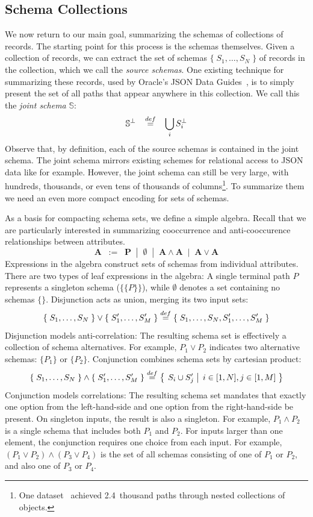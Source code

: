 
\subsection{Schema Collections}
We now return to our main goal, summarizing the schemas of collections of \json records.  
The starting point for this process is the schemas themselves.  
Given a collection of \json records, we can extract the set of schemas $\{\;S_1, \ldots, S_N\;\}$ of records in the collection, which we call the \emph{source schemas}.
One existing technique for summarizing these records, used by Oracle's JSON Data Guides~\cite{oracledataguide,DBLP:conf/sigmod/LiuHMLC16}, is to simply present the set of all paths that appear anywhere in this collection.
We call this the \emph{joint schema} $\mathbb S$:
$$\mathbb S^\bot \;\;\; \overset{def}{=} \;\;\; \bigcup_i S_i^\bot$$
Observe that, by definition, each of the source schemas is contained in the joint schema.
The joint schema mirrors existing schemes for relational access to JSON data like  for example.  
However, the joint schema can still be very large, with hundreds, thousands, or even tens of thousands of columns\footnote{One dataset~\cite{pharmadata} achieved 2.4~thousand paths through nested collections of objects.}.
To summarize them we need an even more compact encoding for sets of schemas.  

As a basis for compacting schema sets, we define a simple algebra.
Recall that we are particularly interested in summarizing cooccurrence and anti-cooccurence relationships between attributes.
$$\mathbf{A}\;\;:=\;\;\mathbf{P}\;\;|\;\;\emptyset\;\;|\;\;\mathbf{A} \wedge \mathbf{A}\;\;|\;\;\mathbf{A} \vee \mathbf{A}$$
Expressions in the algebra construct sets of schemas from individual attributes.
There are two types of leaf expressions in the algebra:
A single terminal path $P$ represents a singleton schema ($\big\{\{P\}\big\}$), while $\emptyset$ denotes a set containing no schemas $\big\{\big\}$.
Disjunction acts as union, merging its two input sets:
$$
\{\;S_1, \ldots, S_N\;\} \vee \{\;S'_1, \ldots, S'_M\;\} 
\overset{def}{=}
\{\;S_1, \ldots, S_N, S'_1, \ldots, S'_M\;\}
$$
Disjunction models anti-correlation: The resulting schema set is effectively a collection of schema alternatives.  
For example, $P_1 \vee P_2$ indicates two alternative schemas: $\{P_1\}$ or $\{P_2\}$.
Conjunction combines schema sets by cartesian product:
{\small
$$
\{\;S_1, \ldots, S_N\;\} \wedge \{\;S'_1, \ldots, S'_M\;\} 
\overset{def}{=} 
\left\{\left.\;{ S_i \cup S'_j}\;\right|\;{ i \in [1,N], j \in [1, M] }\;\right\}
$$
}
Conjunction models correlations: The resulting schema set mandates that exactly one option from the left-hand-side and one option from the right-hand-side be present.
On singleton inputs, the result is also a singleton.
For example, $P_1 \wedge P_2$ is a single schema that includes both $P_1$ and $P_2$.  
For inputs larger than one element, the conjunction requires one choice from each input.
For example, $(P_1\vee P_2)\wedge(P_3 \vee P_4)$ is the set of all schemas consisting of one of $P_1$ or $P_2$, and also one of $P_3$ or $P_4$.


